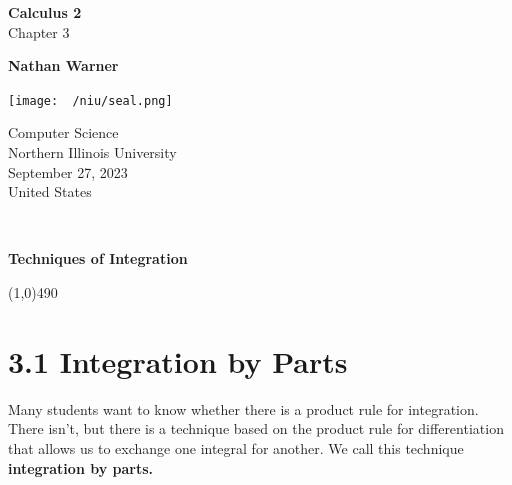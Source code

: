 \documentclass{report}
\title{\Huge{}}
\author{\huge{Nathan Warner}}
\date{\huge{}}
\begin{document}
        \begin{titlepage}
       \begin{center}
           \vspace*{1cm}
    
           \textbf{Calculus 2} \\
           Chapter 3
    
           \vspace{0.5cm}
            
                
           \vspace{1.5cm}
    
           \textbf{Nathan Warner}
    
           \vfill
                
                
           \vspace{0.8cm}
         
           \texttt{[image: ~/niu/seal.png]}
                
           Computer Science \\
           Northern Illinois University\\
           September 27, 2023 \\
           United States\\
           
                
       \end{center}
    \end{titlepage}
    \tableofcontents
    \pagebreak \bigbreak \noindent
    \vspace{2in} \\
    \begin{Huge}
       \textbf{Techniques of Integration} 
    \end{Huge}
    \bigbreak \noindent 
    \line(1,0){490}
    \bigbreak \noindent 
    
    \section*{\Large 3.1 Integration by Parts}
    \bigbreak \noindent 
    \smallbreak \noindent
    \begin{definition}
        Many students want to know whether there is a product rule for integration. There isn’t, but there is a technique based on the product rule for differentiation that allows us to exchange one integral for another. We call this technique \textbf{integration by parts.}
    \end{definition}
\end{document}
